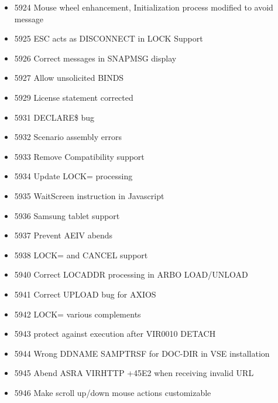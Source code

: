 \documentclass[letterpaper,10pt,english]{sphinxmanual}
\begin{document}
\begin{itemize}
\item {} 
5924 Mouse wheel enhancement, Initialization process modified to avoid message

\item {} 
5925 ESC acts as DISCONNECT in LOCK Support

\item {} 
5926 Correct messages in SNAPMSG display

\item {} 
5927 Allow unsolicited BINDS

\item {} 
5929 License statement corrected

\item {} 
5931 DECLARE\$ bug

\item {} 
5932 Scenario assembly errors

\item {} 
5933 Remove Compatibility support

\item {} 
5934 Update LOCK= processing

\item {} 
5935 WaitScreen instruction in Javascript

\item {} 
5936 Samsung tablet support

\item {} 
5937 Prevent AEIV abends

\item {} 
5938 LOCK= and CANCEL support

\item {} 
5940 Correct LOCADDR processing in ARBO LOAD/UNLOAD

\item {} 
5941 Correct UPLOAD bug for AXIOS

\item {} 
5942 LOCK= various complements

\item {} 
5943 protect against execution after VIR0010 DETACH

\item {} 
5944 Wrong DDNAME SAMPTRSF for DOC-DIR in VSE installation

\item {} 
5945 Abend ASRA VIRHTTP +45E2 when receiving invalid URL

\item {} 
5946 Make scroll up/down mouse actions customizable


\end{itemize}
\end{document}
